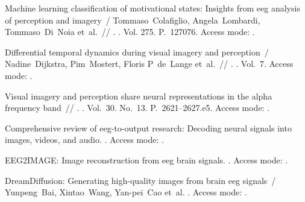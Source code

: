 \expandafter\long\expandafter\gdef\csname fullcite@10.1016/j.eswa.2025.127076\endcsname{%
Machine learning classification of motivational states: Insights from eeg
  analysis of perception and imagery~/ Tommaso~Colafiglio, Angela~Lombardi,
  Tommaso~Di~Noia et~al.~//
  \href{http://dx.doi.org/10.1016/j.eswa.2025.127076}{}. \BibDash
{}. \BibDash
\newblock Vol. 275. \BibDash
\newblock P.~127076. \BibDash
\newblock Access mode: .
}

\expandafter\long\expandafter\gdef\csname fullcite@10.7554/elife.33904\endcsname{%
Differential temporal dynamics during visual imagery and perception~/
  Nadine~Dijkstra, Pim~Mostert, Floris P~de~Lange et~al.~//
  \href{http://dx.doi.org/10.7554/elife.33904}{}. \BibDash
{}. \BibDash
\newblock Vol.~7. \BibDash
\newblock Access mode: .
}

\expandafter\long\expandafter\gdef\csname fullcite@10.1016/j.cub.2020.04.074\endcsname{%
 Visual imagery and perception share
  neural representations in the alpha frequency band~//
  \href{http://dx.doi.org/10.1016/j.cub.2020.04.074}{}. \BibDash
{}. \BibDash
\newblock Vol.~30. No.~13. \BibDash
\newblock P.~2621--2627.e5. \BibDash
\newblock Access mode: .
}

\expandafter\long\expandafter\gdef\csname fullcite@10.48550/arxiv.2412.19999\endcsname{%
 Comprehensive review of eeg-to-output research:
  Decoding neural signals into images, videos, and audio. \BibDash
{}. \BibDash
\newblock Access mode: .
}

\expandafter\long\expandafter\gdef\csname fullcite@10.48550/arxiv.2302.10121\endcsname{%
 EEG2IMAGE: Image
  reconstruction from eeg brain signals. \BibDash
{}. \BibDash
\newblock Access mode: .
}

\expandafter\long\expandafter\gdef\csname fullcite@10.48550/arxiv.2306.16934\endcsname{%
DreamDiffusion: Generating high-quality images from brain eeg signals~/
  Yunpeng~Bai, Xintao~Wang, Yan-pei~Cao et~al. \BibDash
{}. \BibDash
\newblock Access mode: .
}

